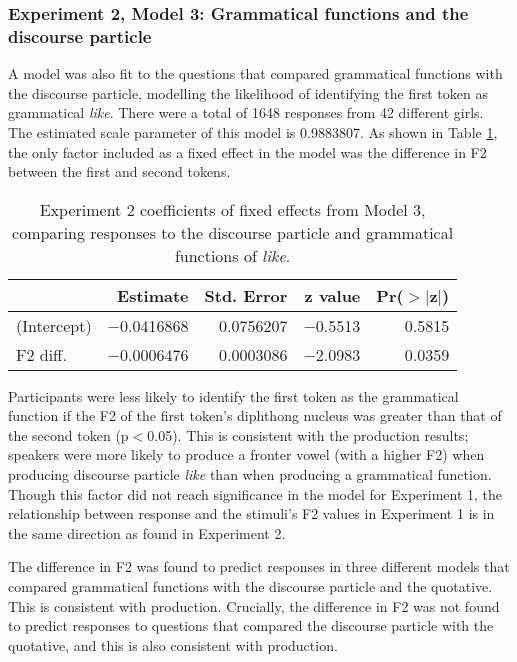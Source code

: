 \subsubsection{Experiment 2, Model 3: Grammatical functions and the discourse particle}

A model was also fit to the questions that compared grammatical functions with the discourse particle, modelling the likelihood of identifying the first token as grammatical \textit{like}.   There were a total of 1648 responses from 42 different girls.  The estimated scale parameter of this model is 0.9883807.  As shown in Table \ref{dpgramcoeffExp2}, the only factor included as a fixed effect in the model was the difference in F2 between the first and second tokens.


\begin{table}[ht]
\begin{center}
\begin{tabular}{lrrrr}
  \hline
 & Estimate & Std. Error & z value& Pr($>$$|$z$|$) \\
  \hline
(Intercept) & $-$0.0416868 & 0.0756207 & $-$0.5513 &  0.5815 \\
  F2 diff.  & $-$0.0006476 & 0.0003086 & $-$2.0983  & 0.0359 \\
   \hline
\end{tabular}
\caption{Experiment 2 coefficients of fixed effects from Model 3, comparing responses to the discourse particle and grammatical functions of \textit{like}.}
\label{dpgramcoeffExp2}
\end{center}
\end{table}

Participants were less likely to identify the first token as the grammatical function if the F2 of the first token's diphthong nucleus was greater than that of the second token (p$<$0.05).  This is consistent with the production results; speakers were more likely to produce a fronter vowel (with a higher F2) when producing discourse particle \textit{like} than when producing a grammatical function.  Though this factor did not reach significance in the model for Experiment 1, the relationship between response and the stimuli's F2 values in Experiment 1 is in the same direction as found in Experiment 2.

The difference in F2 was found to predict responses in three different models that compared grammatical functions with the discourse particle and the quotative.  This is consistent with production.  Crucially, the difference in F2 was not found to predict responses to questions that compared the discourse particle with the quotative, and this is also consistent with production.

